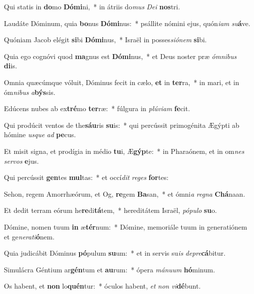 \item Qui statis in \textbf{do}mo \textbf{Dó}\textbf{mi}ni,~* in átriis do\textit{mus} \textit{De}\textit{i} \textbf{nos}tri.
\item Laudáte Dóminum, quia \textbf{bo}nus \textbf{Dó}\textbf{mi}nus:~* psállite nómini ejus, quón\textit{i}\textit{am} \textit{su}\textbf{á}ve.
\item Quóniam Jacob elégit \textbf{si}bi \textbf{Dó}\textbf{mi}nus,~* Israël in posses\textit{si}\textit{ó}\textit{nem} \textbf{si}bi.
\item Quia ego cognóvi quod \textbf{ma}gnus est \textbf{Dó}\textbf{mi}nus,~* et Deus noster præ \textit{óm}\textit{ni}\textit{bus} \textbf{di}is.
\item Omnia quæcúmque vóluit, Dóminus fecit in cælo, \textbf{et} in \textbf{ter}ra,~* in mari, et in óm\textit{ni}\textit{bus} \textit{a}\textbf{býs}sis.
\item Edúcens nubes ab ex\textbf{tré}mo \textbf{ter}ræ:~* fúlgura in \textit{plú}\textit{vi}\textit{am} \textbf{fe}cit.
\item Qui prodúcit ventos de the\textbf{sáu}ris \textbf{su}is:~* qui percússit primogénita Ægýpti ab hómine \textit{us}\textit{que} \textit{ad} \textbf{pe}cus.
\item Et misit signa, et prodígia in médio \textbf{tu}i, Æ\textbf{gýp}te:~* in Pharaónem, et in om\textit{nes} \textit{ser}\textit{vos} \textbf{e}jus.
\item Qui percússit \textbf{gen}tes \textbf{mul}tas:~* et occí\textit{dit} \textit{re}\textit{ges} \textbf{for}tes:
\item Sehon, regem Amorrhæórum, et Og, \textbf{re}gem \textbf{Ba}san,~* et ómni\textit{a} \textit{re}\textit{gna} \textbf{Chá}naan.
\item Et dedit terram eórum he\textbf{re}di\textbf{tá}tem,~* hereditátem Israël, \textit{pó}\textit{pu}\textit{lo} \textbf{su}o.
\item Dómine, nomen tuum \textbf{in} æ\textbf{tér}num:~* Dómine, memoriále tuum in generatiónem et ge\textit{ne}\textit{ra}\textit{ti}\textbf{ó}nem.
\item Quia judicábit Dóminus \textbf{pó}pulum \textbf{su}um:~* et in servis su\textit{is} \textit{de}\textit{pre}\textbf{cá}bitur.
\item Simulácra Géntium ar\textbf{gén}tum et \textbf{au}rum:~* ópera \textit{má}\textit{nu}\textit{um} \textbf{hó}minum.
\item Os habent, et \textbf{non} lo\textbf{quén}tur:~* óculos habent, \textit{et} \textit{non} \textit{vi}\textbf{dé}bunt.
